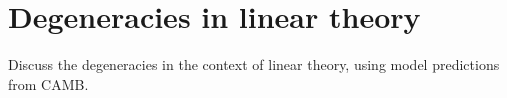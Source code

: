 \section{Degeneracies in linear theory}
\label{sec:lin}

Discuss the degeneracies in the context of linear theory, using model
predictions from CAMB.


